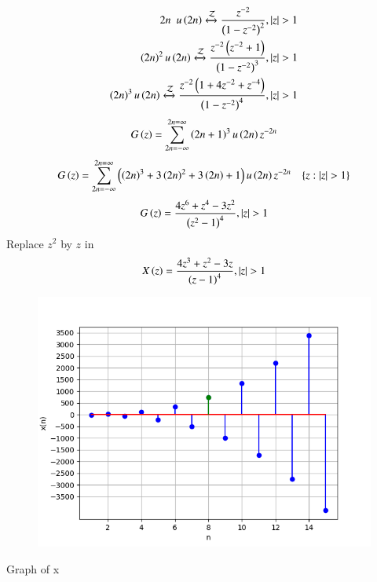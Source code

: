 \documentclass[beamer]{IEEEtran}
\theoremstyle{remark}
\begin{document}
\begin{align}
	{2n} \hspace{5pt} u\left(2n\right) \xleftrightarrow{\mathcal{Z}} \frac{z^{-2}}{\left(1-z^{-2}\right)^2},\left\vert z\right\vert >1 \\
    \left(2n\right)^2  u\left(2n\right) \xleftrightarrow{\mathcal{Z}} \frac{z^{-2}\left(z^{-2}+1\right)}{\left(1-z^{-2}\right)^3},\left\vert z\right\vert > 1 \\
	\left(2n\right)^3 u\left(2n\right) \xleftrightarrow{\mathcal{Z}}  \frac{z^{-2}\left(1+4z^{-2}+z^{-4}\right)}{\left(1-z^{-2}\right)^4},\left\vert z\right\vert >1
\end{align}
\begin{align}
	G\left(z\right)=\sum_{2n=-\infty}^{2n=\infty}\left(2n+1\right)^{3}u\left(2n\right)z^{-2n}
\end{align}
\begin{align}
	G\brak{z}=\sum_{2n=-\infty}^{2n=\infty}\brak{\brak{2n}^3+3\brak{2n}^2+3\brak{2n}+1}u\brak{2n}z^{-2n}\hspace{10pt}
\{z:|z|>1\}
\end{align} 
\begin{align}
	G\left(z\right)=\frac{4z^6+z^4-3z^2}{\left(z^2-1\right)^4}, \left\vert z\right\vert>1 
\end{align}
Replace $z^2$ by $z$ in 
\begin{align}
	X\left(z\right)=\frac{4z^3+z^2-3z}{\left(z-1\right)^4} , \left\vert z\right\vert>1
\end{align}

\begin{figure}[h]
    \centering
    \includegraphics[width=1 \columnwidth]{figs/graph.png} 
    \label{fig:11.9.1.9.1}
\end{figure}
\begin{center}
Graph of x
   \end{center}
\end{document}
